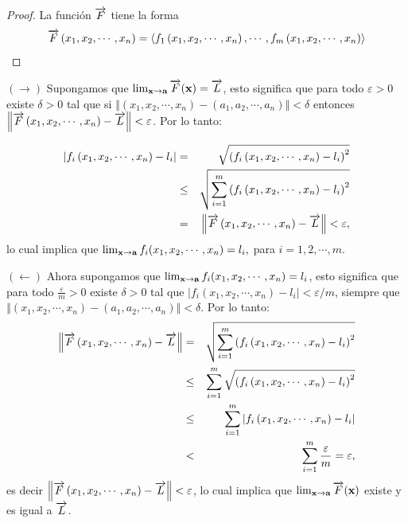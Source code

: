 \begin{proof}
  La función $\overrightarrow{F}$ tiene la forma
  $$\overrightarrow{F}\left( x_{1},x_{2},\cdots ,x_{n}\right) =\left\langle f_{1}\left( x_{1},x_{2},\cdots ,x_{n}\right) ,\cdots ,f_{m}\left( x_{1},x_{2},\cdots ,x_{n}\right)\right\rangle $$
\end{proof}
\begin{parrafoitemize}

\item $(\to)$ Supongamos que $\lim_{{\bf x}\to {\bf a}}\overrightarrow{F}({\bf x})= \overrightarrow{L}$,
  esto significa que para todo $\varepsilon >0$ existe $\delta >0$  tal que si
  $\left\Vert\left( x_{1},x_{2},\cdots ,x_{n}\right) -\left( a_{1},a_{2},\cdots ,a_{n}\right) \right\Vert <\delta $
  entonces $\left\Vert \overrightarrow{F}\left( x_{1},x_{2},\cdots ,x_{n}\right) -\overrightarrow{L}\right\Vert <\varepsilon $. Por lo tanto:

  \begin{eqnarray*}
    \left\vert f_{i}\left( x_{1},x_{2},\cdots ,x_{n}\right) -l_{i}\right\vert &=&
    \sqrt{\left( f_{i}\left( x_{1},x_{2},\cdots ,x_{n}\right) -l_{i}\right) ^{2}} \\
    &\leq& \sqrt{\sum_{i=1}^{m}\left( f_{i}\left(x_{1},x_{2},\cdots ,x_{n}\right) -l_{i}\right) ^{2}} \\
    &=& \left\Vert \overrightarrow{F}\left( x_{1},x_{2},\cdots ,x_{n}\right) -\overrightarrow{L}\right\Vert <\varepsilon,
  \end{eqnarray*}
  lo cual implica que $\lim_{{\bf x}\to {\bf a}} f_{i}(x_{1},x_{2},\cdots ,x_{n})=l_i, $
  para $i=1,2, \cdots, m. $

\item $(\leftarrow)$ Ahora supongamos que $\lim_{{\bf x}\to {\bf a}} f_{i}(x_{1},x_{2},\cdots ,x_{n})=l_i$,
  esto significa que para todo $\frac{\varepsilon}{m}>0$ existe $\delta>0$ tal que
  $|f_i( x_{1},x_{2},\cdots ,x_{n}) -l_i| <\varepsilon/m $, siempre que
  $\left\Vert\left( x_{1},x_{2},\cdots ,x_{n}\right) -\left( a_{1},a_{2},\cdots ,a_{n}\right) \right\Vert <\delta $.
  Por lo tanto:
  {\small
    \begin{eqnarray*}
      \left\Vert \overrightarrow{F}\left( x_{1},x_{2},\cdots ,x_{n}\right) - \overrightarrow{L}\right\Vert &=&
      \sqrt{\sum_{i=1}^{m}\left( f_{i}\left(x_{1},x_{2},\cdots ,x_{n}\right) -l_{i}\right) ^{2}} \\
      &\leq & \sum_{i=1}^{m}\sqrt{\left( f_{i}\left( x_{1},x_{2},\cdots ,x_{n}\right)-l_{i}\right) ^{2}}\\
      &\leq& \sum_{i=1}^{m}\left\vert f_{i}\left( x_{1},x_{2},\cdots ,x_{n}\right)-l_{i} \right\vert\\ & <& \sum_{i=1}^{m}\frac{\varepsilon }{m}=\varepsilon,
    \end{eqnarray*}
  }
  es decir $\left\Vert \overrightarrow{F}\left( x_{1},x_{2},\cdots ,x_{n}\right) -\overrightarrow{L}\right\Vert <\varepsilon $,
  lo cual implica que $\lim_{{\bf x}\to {\bf a}}\overrightarrow{F}({\bf x})$ existe y es igual a $\overrightarrow{L}$.
\end{parrafoitemize}

